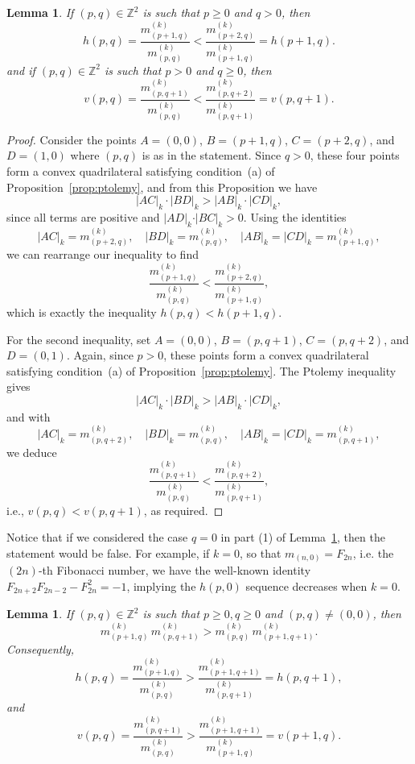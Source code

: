 \documentclass{article}
\newtheorem{lemma}[theorem]{Lemma}
\theoremstyle{remark}
\begin{document}
\begin{lemma}\label{lem:hv1}
If $(p,q) \in \mathbb{Z}^2 $ is such that $p \geq 0$ and  $q > 0$, then
\[
    h(p,q) = \frac{m^{(k)}_{(p+1,q)}}{m^{(k)}_{(p,q)}} 
    < 
    \frac{m^{(k)}_{(p+2,q)}}{m^{(k)}_{(p+1,q)}} = h(p+1,q).
\]
and if $(p,q) \in \mathbb{Z}^2 $ is such that $p > 0$ and  $q \geq 0$, then
\[
    v(p,q) = \frac{m^{(k)}_{(p,q+1)}}{m^{(k)}_{(p,q)}} 
    < 
    \frac{m^{(k)}_{(p,q+2)}}{m^{(k)}_{(p,q+1)}} = v(p,q+1).
\]
\end{lemma}

\begin{proof}
 Consider the points $A = (0,0)$, $B = (p+1,q)$, $C = (p+2,q)$, and $D = (1,0)$ where $(p,q)$ is as in the statement.  
Since $q > 0$, these four points form a convex quadrilateral satisfying condition~(a) of Proposition~\ref{prop:ptolemy}, and from this Proposition we have
\[
    |AC|_k \cdot |BD|_k > |AB|_k \cdot |CD|_k,
\]
since all terms are positive and $\vert AD \vert_k \cdot \vert BC \vert_k > 0$. 
Using the identities
\[
    |AC|_k = m^{(k)}_{(p+2,q)}, \quad 
    |BD|_k = m^{(k)}_{(p,q)}, \quad 
    |AB|_k = |CD|_k = m^{(k)}_{(p+1,q)},
\]
we can rearrange our inequality to find
\[
    \frac{m^{(k)}_{(p+1,q)}}{m^{(k)}_{(p,q)}} 
    < 
    \frac{m^{(k)}_{(p+2,q)}}{m^{(k)}_{(p+1,q)}},
\]
which is exactly the inequality $h(p,q) < h(p+1,q)$.


For the second inequality, set $A = (0,0)$, $B = (p,q+1)$, $C = (p,q+2)$, and $D = (0,1)$.  
Again, since $p > 0$, these points form a convex quadrilateral satisfying condition~(a) of Proposition~\ref{prop:ptolemy}.  
The Ptolemy inequality gives
\[
    |AC|_k \cdot |BD|_k > |AB|_k \cdot |CD|_k,
\]
and with
\[
    |AC|_k = m^{(k)}_{(p,q+2)}, \quad 
    |BD|_k = m^{(k)}_{(p,q)}, \quad 
    |AB|_k = |CD|_k = m^{(k)}_{(p,q+1)},
\]
we deduce
\[
    \frac{m^{(k)}_{(p,q+1)}}{m^{(k)}_{(p,q)}} 
    < 
    \frac{m^{(k)}_{(p,q+2)}}{m^{(k)}_{(p,q+1)}},
\]
i.e., $v(p,q) < v(p,q+1)$, as required.
\end{proof}

Notice that if we considered the case $q = 0$ in part (1) of Lemma~\ref{lem:hv1}, then the statement would be false. For example, if $k = 0$, so that $m_{(n,0)} = F_{2n}$, i.e. the $(2n)$-th Fibonacci number, we have the well-known identity $F_{2n+2}F_{2n-2} - F_{2n}^2 = -1$, implying  the $h(p,0)$ sequence decreases when $k =0 $.

\begin{lemma}\label{lem:hv2}
If $(p,q) \in \mathbb{Z}^2 $ is such that $p \geq 0, q \geq 0$ and $(p,q) \neq (0,0)$, then
\[
    m^{(k)}_{(p+1,q)} \, m^{(k)}_{(p,q+1)}
    > 
    m^{(k)}_{(p,q)} \, m^{(k)}_{(p+1,q+1)}.
\]
Consequently,
\[
    h(p,q) = \frac{m^{(k)}_{(p+1,q)}}{m^{(k)}_{(p,q)}}
    > 
    \frac{m^{(k)}_{(p+1,q+1)}}{m^{(k)}_{(p,q+1)}} = h(p,q+1),
\]
and
\[
    v(p,q) = \frac{m^{(k)}_{(p,q+1)}}{m^{(k)}_{(p,q)}} 
    > 
    \frac{m^{(k)}_{(p+1,q+1)}}{m^{(k)}_{(p+1,q)}} = v(p+1,q).
\]
\end{lemma}
\end{document}
